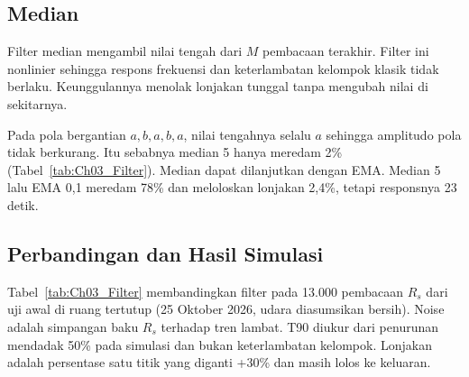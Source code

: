     \subsection{Median}
    \label{sec:Penyaringan_Median}

    Filter median mengambil nilai tengah dari $M$ pembacaan terakhir. Filter ini nonlinier sehingga respons frekuensi dan keterlambatan kelompok klasik tidak berlaku. Keunggulannya menolak lonjakan tunggal tanpa mengubah nilai di sekitarnya.

    Pada pola bergantian $a, b, a, b, a$, nilai tengahnya selalu $a$ sehingga amplitudo pola tidak berkurang. Itu sebabnya median 5 hanya meredam 2\% (Tabel~\ref{tab:Ch03_Filter}). Median dapat dilanjutkan dengan EMA. Median 5 lalu EMA 0,1 meredam 78\% dan meloloskan lonjakan 2,4\%, tetapi responsnya 23 detik.

    \subsection{Perbandingan dan Hasil Simulasi}
    \label{sec:Penyaringan_Hasil}

    Tabel~\ref{tab:Ch03_Filter} membandingkan filter pada 13.000 pembacaan $R_s$ dari uji awal di ruang tertutup (25 Oktober 2026, udara diasumsikan bersih). Noise adalah simpangan baku $R_s$ terhadap tren lambat. T90 diukur dari penurunan mendadak 50\% pada simulasi dan bukan keterlambatan kelompok. Lonjakan adalah persentase satu titik yang diganti +30\% dan masih lolos ke keluaran.

